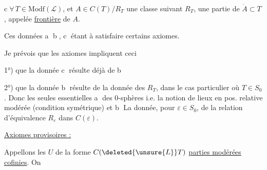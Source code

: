 
\textcircled{\scriptsize c}\quad $\forall\,T\in\mathrm{Modf}(\mathcal L)$, et $A\in C(T)/R_T$
une classe suivant $R_T$, une partie
de $\dot A\subset T$, appelée \uline{frontière} de $A$.

Ces données \textcircled{\scriptsize a} \textcircled{\scriptsize b}, \textcircled{\scriptsize c} étant 
à satisfaire certains axiomes.

Je prévois que les axiomes impliquent
ceci

1°) que la donnée \textcircled{\scriptsize c} résulte déjà de \textcircled{\scriptsize b}

2°) que la donnée \textcircled{\scriptsize b} résulte de
la donnée des $R_T$,  dans le cas
particulier où $T\in S_0$. Donc
les seules  essentielles 
\textcircled{\scriptsize a}  des 0-sphères i.e. la notion
de  lieux en pos. relative modérée
(condition  symétrique) et \textcircled{\scriptsize b} La donnée,
pour  $\varepsilon\in S_0$, de la relation
d'équivalence $R_{\varepsilon}$ dans $C(\varepsilon)$.

 \uline{Axiomes provisoires :}

 Appellons les $U$ de la forme
$C(\deleted{\unsure{L}}T)$ \uline{parties modérées cofinies}. On

